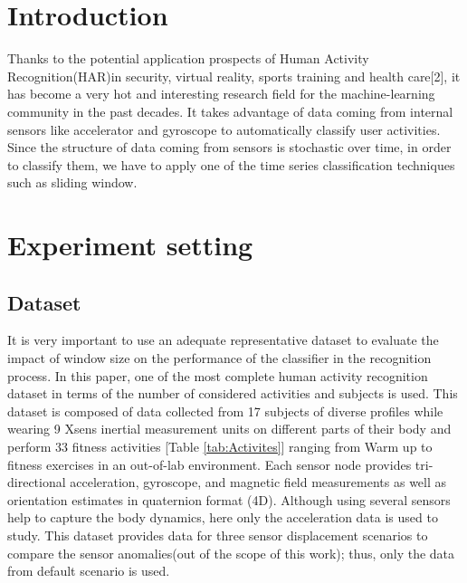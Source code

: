 \section{Introduction}
Thanks to the potential application prospects of Human Activity Recognition(HAR)in security, virtual reality, sports training and health care[2], it has become a very hot and interesting research field for the machine-learning community in the past decades. It takes advantage of data coming from internal sensors like accelerator and gyroscope to automatically classify user activities. Since the structure of data coming from sensors is stochastic over time, in order to classify them, we have to apply one of the time series classification techniques such as sliding window.

\section{Experiment setting}

\subsection{Dataset}
It is very important to use an adequate representative dataset to evaluate the impact of window size on the performance of the classifier in the recognition process. In this paper, one of the most complete human activity recognition dataset \cite{banos2012benchmark} in terms of the number of considered activities and subjects is used. This dataset is composed of data collected from 17 subjects of diverse profiles while wearing 9 Xsens inertial measurement units on different parts of their body and perform 33 fitness activities [Table \ref{tab:Activites}] ranging from Warm up to fitness exercises in an out-of-lab environment. Each sensor node provides tri-directional acceleration, gyroscope, and magnetic field
measurements as well as orientation estimates in quaternion format (4D). Although using several sensors help to capture the body dynamics, here only the acceleration data is used to study. This dataset provides data for three sensor displacement scenarios to compare the sensor anomalies(out of the scope of this work); thus, only the data from default scenario is used.

